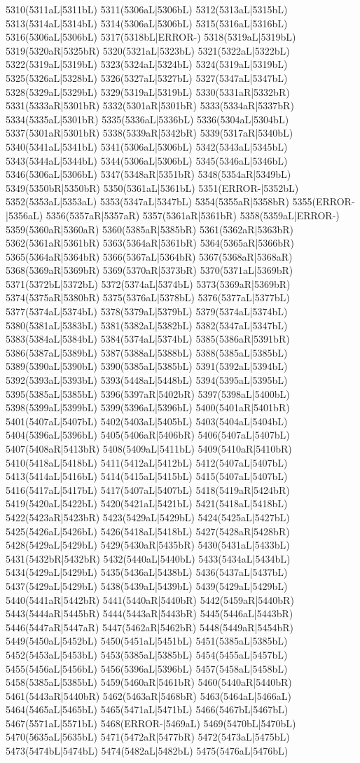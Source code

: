5310(5311aL|5311bL) 5311(5306aL|5306bL) 5312(5313aL|5315bL) 5313(5314aL|5314bL) 5314(5306aL|5306bL) 5315(5316aL|5316bL) 5316(5306aL|5306bL) 5317(5318bL|ERROR-) 5318(5319aL|5319bL) 5319(5320aR|5325bR) 5320(5321aL|5323bL) 5321(5322aL|5322bL) 5322(5319aL|5319bL) 5323(5324aL|5324bL) 5324(5319aL|5319bL) 5325(5326aL|5328bL) 5326(5327aL|5327bL) 5327(5347aL|5347bL) 5328(5329aL|5329bL) 5329(5319aL|5319bL) 5330(5331aR|5332bR) 5331(5333aR|5301bR) 5332(5301aR|5301bR) 5333(5334aR|5337bR) 5334(5335aL|5301bR) 5335(5336aL|5336bL) 5336(5304aL|5304bL) 5337(5301aR|5301bR) 5338(5339aR|5342bR) 5339(5317aR|5340bL) 5340(5341aL|5341bL) 5341(5306aL|5306bL) 5342(5343aL|5345bL) 5343(5344aL|5344bL) 5344(5306aL|5306bL) 5345(5346aL|5346bL) 5346(5306aL|5306bL) 5347(5348aR|5351bR) 5348(5354aR|5349bL) 5349(5350bR|5350bR) 5350(5361aL|5361bL) 5351(ERROR-|5352bL) 5352(5353aL|5353aL) 5353(5347aL|5347bL) 5354(5355aR|5358bR) 5355(ERROR-|5356aL) 5356(5357aR|5357aR) 5357(5361aR|5361bR) 5358(5359aL|ERROR-) 5359(5360aR|5360aR) 5360(5385aR|5385bR) 5361(5362aR|5363bR) 5362(5361aR|5361bR) 5363(5364aR|5361bR) 5364(5365aR|5366bR) 5365(5364aR|5364bR) 5366(5367aL|5364bR) 5367(5368aR|5368aR) 5368(5369aR|5369bR) 5369(5370aR|5373bR) 5370(5371aL|5369bR) 5371(5372bL|5372bL) 5372(5374aL|5374bL) 5373(5369aR|5369bR) 5374(5375aR|5380bR) 5375(5376aL|5378bL) 5376(5377aL|5377bL) 5377(5374aL|5374bL) 5378(5379aL|5379bL) 5379(5374aL|5374bL) 5380(5381aL|5383bL) 5381(5382aL|5382bL) 5382(5347aL|5347bL) 5383(5384aL|5384bL) 5384(5374aL|5374bL) 5385(5386aR|5391bR) 5386(5387aL|5389bL) 5387(5388aL|5388bL) 5388(5385aL|5385bL) 5389(5390aL|5390bL) 5390(5385aL|5385bL) 5391(5392aL|5394bL) 5392(5393aL|5393bL) 5393(5448aL|5448bL) 5394(5395aL|5395bL) 5395(5385aL|5385bL) 5396(5397aR|5402bR) 5397(5398aL|5400bL) 5398(5399aL|5399bL) 5399(5396aL|5396bL) 5400(5401aR|5401bR) 5401(5407aL|5407bL) 5402(5403aL|5405bL) 5403(5404aL|5404bL) 5404(5396aL|5396bL) 5405(5406aR|5406bR) 5406(5407aL|5407bL) 5407(5408aR|5413bR) 5408(5409aL|5411bL) 5409(5410aR|5410bR) 5410(5418aL|5418bL) 5411(5412aL|5412bL) 5412(5407aL|5407bL) 5413(5414aL|5416bL) 5414(5415aL|5415bL) 5415(5407aL|5407bL) 5416(5417aL|5417bL) 5417(5407aL|5407bL) 5418(5419aR|5424bR) 5419(5420aL|5422bL) 5420(5421aL|5421bL) 5421(5418aL|5418bL) 5422(5423aR|5423bR) 5423(5429aL|5429bL) 5424(5425aL|5427bL) 5425(5426aL|5426bL) 5426(5418aL|5418bL) 5427(5428aR|5428bR) 5428(5429aL|5429bL) 5429(5430aR|5435bR) 5430(5431aL|5433bL) 5431(5432bR|5432bR) 5432(5440aL|5440bL) 5433(5434aL|5434bL) 5434(5429aL|5429bL) 5435(5436aL|5438bL) 5436(5437aL|5437bL) 5437(5429aL|5429bL) 5438(5439aL|5439bL) 5439(5429aL|5429bL) 5440(5441aR|5442bR) 5441(5440aR|5440bR) 5442(5459aR|5440bR) 5443(5444aR|5445bR) 5444(5443aR|5443bR) 5445(5446aL|5443bR) 5446(5447aR|5447aR) 5447(5462aR|5462bR) 5448(5449aR|5454bR) 5449(5450aL|5452bL) 5450(5451aL|5451bL) 5451(5385aL|5385bL) 5452(5453aL|5453bL) 5453(5385aL|5385bL) 5454(5455aL|5457bL) 5455(5456aL|5456bL) 5456(5396aL|5396bL) 5457(5458aL|5458bL) 5458(5385aL|5385bL) 5459(5460aR|5461bR) 5460(5440aR|5440bR) 5461(5443aR|5440bR) 5462(5463aR|5468bR) 5463(5464aL|5466aL) 5464(5465aL|5465bL) 5465(5471aL|5471bL) 5466(5467bL|5467bL) 5467(5571aL|5571bL) 5468(ERROR-|5469aL) 5469(5470bL|5470bL) 5470(5635aL|5635bL) 5471(5472aR|5477bR) 5472(5473aL|5475bL) 5473(5474bL|5474bL) 5474(5482aL|5482bL) 5475(5476aL|5476bL) 